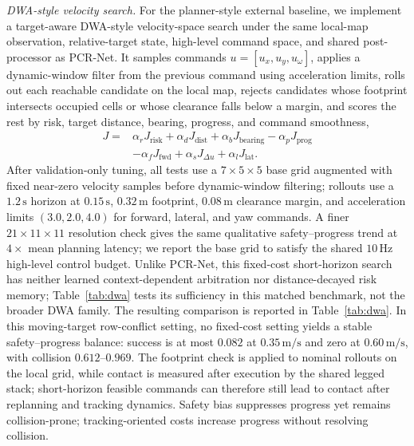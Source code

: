 \documentclass[letterpaper, 10 pt, conference]{ieeeconf}
\newcommand{\msec}{\,\mathrm{m/s}}
\begin{document}
\emph{DWA-style velocity search.} For the planner-style external baseline,
we implement a target-aware DWA-style velocity-space search under the same
local-map observation, relative-target state, high-level command space, and
shared post-processor as PCR-Net. It samples commands
$u=[u_x,u_y,u_\omega]$, applies a dynamic-window filter from the previous
command using acceleration limits, rolls out each reachable candidate on the
local map, rejects candidates whose footprint intersects occupied cells or
whose clearance falls below a margin, and scores the rest by risk, target
distance, bearing, progress, and command smoothness,
\begin{equation}
\begin{aligned}
J={}&\alpha_r J_{\mathrm{risk}}+\alpha_d J_{\mathrm{dist}}
+\alpha_b J_{\mathrm{bearing}}-\alpha_p J_{\mathrm{prog}}\\
&-\alpha_f J_{\mathrm{fwd}}+\alpha_s J_{\Delta u}+\alpha_l J_{\mathrm{lat}}.
\end{aligned}
\label{eq:dwa_cost}
\end{equation}
After validation-only tuning, all tests use a $7{\times}5{\times}5$ base
grid augmented with fixed near-zero velocity samples before dynamic-window
filtering; rollouts use a
$1.2\,\mathrm{s}$ horizon at $0.15\,\mathrm{s}$,
$0.32\,\mathrm{m}$ footprint, $0.08\,\mathrm{m}$ clearance margin, and
acceleration limits $(3.0,2.0,4.0)$ for forward, lateral, and yaw commands.
A finer $21{\times}11{\times}11$ resolution check gives the same qualitative
safety--progress trend at $4\times$ mean planning latency; we report the base
grid to satisfy the shared $10\,\mathrm{Hz}$ high-level control budget.
Unlike PCR-Net, this fixed-cost short-horizon search has neither learned
context-dependent arbitration nor distance-decayed risk memory;
Table~\ref{tab:dwa} tests its sufficiency in this matched benchmark, not
the broader DWA family.
The resulting comparison is reported in Table~\ref{tab:dwa}. In this
moving-target row-conflict setting, no fixed-cost setting yields a
stable safety--progress balance: success is at most $0.082$ at $0.35\msec$
and zero at $0.60\msec$, with collision $0.612$--$0.969$. The footprint
check is applied to nominal rollouts on the local grid, while contact is
measured after execution by the shared legged stack; short-horizon feasible
commands can therefore still lead to contact after replanning and tracking
dynamics. Safety bias suppresses progress yet remains collision-prone;
tracking-oriented costs increase progress without resolving collision.
\end{document}

